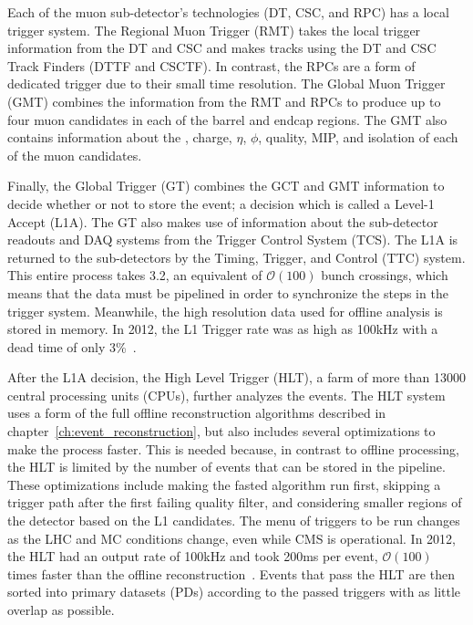 Each of the muon sub-detector's technologies (DT, CSC, and RPC) has a local trigger system.
The Regional Muon Trigger (RMT) takes the local trigger information from the DT and CSC and makes tracks using the DT and CSC Track Finders (DTTF and CSCTF).
In contrast, the RPCs are a form of dedicated trigger due to their small time resolution.
The Global Muon Trigger (GMT) combines the information from the RMT and RPCs to produce up to four muon candidates in each of the barrel and endcap regions.
The GMT also contains information about the \pt, charge, $\eta$, $\phi$, quality, MIP, and isolation of each of the muon candidates.

Finally, the Global Trigger (GT) combines the GCT and GMT information to decide whether or not to store the event; a decision which is called a Level-1 Accept (L1A).
The GT also makes use of information about the sub-detector readouts and DAQ systems from the Trigger Control System (TCS). The L1A is returned to the sub-detectors by the Timing, Trigger, and Control (TTC) system.
This entire process takes 3.2\mus, an equivalent of $\mathcal{O}(100)$ bunch crossings, which means that the data must be pipelined in order to synchronize the steps in the trigger system.
Meanwhile, the high resolution data used for offline analysis is stored in memory. In 2012, the L1 Trigger rate was as high as 100\unit{kHz} with a dead time of only 3\%~\cite{Brooke:2013hnf}.

After the L1A decision, the High Level Trigger (HLT), a farm of more than 13000 central processing units (CPUs), further analyzes the events. The HLT 
system uses a form of the full offline reconstruction algorithms described in chapter~\ref{ch:event_reconstruction}, but also includes several optimizations to make the process faster. This is needed because, in contrast to offline processing, the HLT is limited by the number of events that can be stored in the pipeline. These optimizations include making the fasted algorithm run first, skipping a trigger path after the first failing quality filter, and considering smaller regions of the detector based on the L1 candidates. The menu of triggers to be run changes as the LHC and MC conditions change, even while CMS is operational. In 2012, the HLT had an output rate of 100\unit{kHz} and took 200\unit{ms} per event, $\mathcal{O}(100)$ times faster than the offline reconstruction~\cite{Trocino:2014jya}. Events that pass the HLT are then sorted into primary datasets (PDs) according to the passed triggers with as little overlap as possible.


